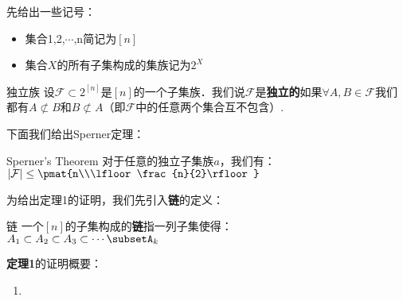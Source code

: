
先给出一些记号：
\begin{itemize}
\item 集合{1,2,$\cdots$,n}简记为$[n]$
\item 集合$X$的所有子集构成的集族记为$2^{X}$
\end{itemize}

\begin{definition}{独立族}
设$\mathcal{F}\subset 2^{[n]}$是$[n]$的一个子集族．我们说$\mathcal{F}$是\textbf{独立的}如果$\forall A,B\in \mathcal{F}$我们都有$A\not\subset B$和$B\not\subset A$（即$\mathcal{F}$中的任意两个集合互不包含）.
\end{definition}

下面我们给出Sperner定理：
\begin{theorem}{Sperner's Theorem}
对于任意的独立子集族$a$，我们有：$|\mathcal{F}|\leq \pmat{n\\\lfloor \frac{n}{2}\rfloor}$

\end{theorem}
为给出定理1的证明，我们先引入\textbf{链}的定义：
\begin{definition}{链}
一个$[n]$的子集构成的\textbf{链}指一列子集使得：\\
$A_1\subset A_2\subset A_3\subset \cdots \subsetA_k$
\end{definition}

\textbf{定理1}的证明概要：\\
\begin{enumerate}
\item 
\end{enumerate}

